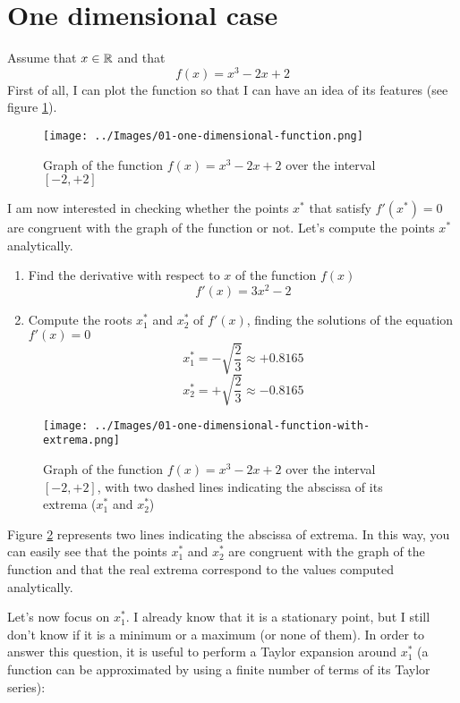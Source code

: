 \section{One dimensional case}
    Assume that \(x \in \mathbb{R}\) and that
    \[f(x) = x^3 - 2x + 2\]
    First of all, I can plot the function so that I can have an idea of its features (see figure \ref{one-dimensional-function}).
    \begin{figure}
        \centering
        \texttt{[image: ../Images/01-one-dimensional-function.png]}
        \caption{Graph of the function \(f(x) = x^3 - 2x + 2\) over the interval \([-2, +2]\)}
        \label{one-dimensional-function}
    \end{figure}
    I am now interested in checking whether the points \(x^*\) that satisfy \(f'(x^*) = 0\) are congruent with the graph of the function or not. Let's compute the points \(x^*\) analytically.
    \begin{enumerate}
        \item Find the derivative with respect to \(x\) of the function \(f(x)\)
        \[f'(x) = 3x^2 - 2\]
        \item Compute the roots \(x^{*}_{1}\) and \(x^{*}_{2}\) of \(f'(x)\), finding the solutions of the equation \(f'(x) = 0\)
        \[x^{*}_{1} = -\sqrt{\frac{2}{3}} \approx +0.8165\]
        \[x^{*}_{2} = +\sqrt{\frac{2}{3}} \approx -0.8165\]
    \end{enumerate}
    \begin{figure}
        \centering
        \texttt{[image: ../Images/01-one-dimensional-function-with-extrema.png]}
        \caption{Graph of the function \(f(x) = x^3 - 2x + 2\) over the interval \([-2, +2]\), with two dashed lines indicating the abscissa of its extrema (\(x^{*}_{1}\) and \(x^{*}_{2}\))}
        \label{one-dimensional-function-with-extrema}
    \end{figure}
    Figure \ref{one-dimensional-function-with-extrema} represents two lines indicating the abscissa of extrema. In this way, you can easily see that the points \(x^{*}_{1}\) and \(x^{*}_{2}\) are congruent with the graph of the function and that the real extrema correspond to the values computed analytically.\par
    Let's now focus on \(x^{*}_{1}\). I already know that it is a stationary point, but I still don't know if it is a minimum or a maximum (or none of them). In order to answer this question, it is useful to perform a Taylor expansion around \(x^{*}_{1}\) (a function can be approximated by using a finite number of terms of its Taylor series):
